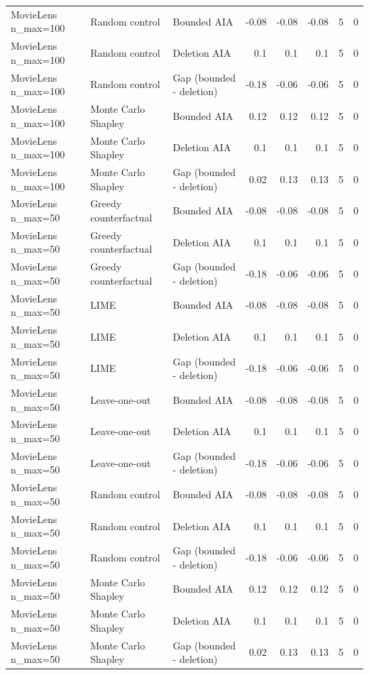 \begin{table}[t]
{\begin{tabular}{lllrrrrr}
MovieLens n\_max=100 & Random control & Bounded AIA & -0.08 & -0.08 & -0.08 & 5 & 0 \\
MovieLens n\_max=100 & Random control & Deletion AIA & 0.1 & 0.1 & 0.1 & 5 & 0 \\
MovieLens n\_max=100 & Random control & Gap (bounded - deletion) & -0.18 & -0.06 & -0.06 & 5 & 0 \\
MovieLens n\_max=100 & Monte Carlo Shapley & Bounded AIA & 0.12 & 0.12 & 0.12 & 5 & 0 \\
MovieLens n\_max=100 & Monte Carlo Shapley & Deletion AIA & 0.1 & 0.1 & 0.1 & 5 & 0 \\
MovieLens n\_max=100 & Monte Carlo Shapley & Gap (bounded - deletion) & 0.02 & 0.13 & 0.13 & 5 & 0 \\
MovieLens n\_max=50 & Greedy counterfactual & Bounded AIA & -0.08 & -0.08 & -0.08 & 5 & 0 \\
MovieLens n\_max=50 & Greedy counterfactual & Deletion AIA & 0.1 & 0.1 & 0.1 & 5 & 0 \\
MovieLens n\_max=50 & Greedy counterfactual & Gap (bounded - deletion) & -0.18 & -0.06 & -0.06 & 5 & 0 \\
MovieLens n\_max=50 & LIME & Bounded AIA & -0.08 & -0.08 & -0.08 & 5 & 0 \\
MovieLens n\_max=50 & LIME & Deletion AIA & 0.1 & 0.1 & 0.1 & 5 & 0 \\
MovieLens n\_max=50 & LIME & Gap (bounded - deletion) & -0.18 & -0.06 & -0.06 & 5 & 0 \\
MovieLens n\_max=50 & Leave-one-out & Bounded AIA & -0.08 & -0.08 & -0.08 & 5 & 0 \\
MovieLens n\_max=50 & Leave-one-out & Deletion AIA & 0.1 & 0.1 & 0.1 & 5 & 0 \\
MovieLens n\_max=50 & Leave-one-out & Gap (bounded - deletion) & -0.18 & -0.06 & -0.06 & 5 & 0 \\
MovieLens n\_max=50 & Random control & Bounded AIA & -0.08 & -0.08 & -0.08 & 5 & 0 \\
MovieLens n\_max=50 & Random control & Deletion AIA & 0.1 & 0.1 & 0.1 & 5 & 0 \\
MovieLens n\_max=50 & Random control & Gap (bounded - deletion) & -0.18 & -0.06 & -0.06 & 5 & 0 \\
MovieLens n\_max=50 & Monte Carlo Shapley & Bounded AIA & 0.12 & 0.12 & 0.12 & 5 & 0 \\
MovieLens n\_max=50 & Monte Carlo Shapley & Deletion AIA & 0.1 & 0.1 & 0.1 & 5 & 0 \\
MovieLens n\_max=50 & Monte Carlo Shapley & Gap (bounded - deletion) & 0.02 & 0.13 & 0.13 & 5 & 0 \\

\end{tabular}}
\end{table}
